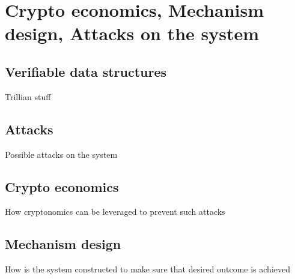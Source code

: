 \section{Crypto economics, Mechanism design, Attacks on the system}
\subsection{Verifiable data structures}
Trillian stuff
\subsection{Attacks}
Possible attacks on the system
\subsection{Crypto economics}
How cryptonomics can be leveraged to prevent such attacks
\subsection{Mechanism design}
How is the system constructed to make sure that desired outcome is achieved